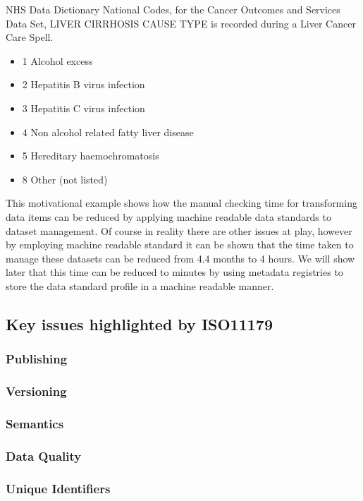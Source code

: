 \documentclass[runningheads]{llncs}
\begin{document}
NHS Data Dictionary National Codes, for the Cancer Outcomes and Services Data Set, LIVER CIRRHOSIS CAUSE TYPE is recorded during a Liver Cancer Care Spell.
\begin{itemize}
	\item 1	Alcohol excess
	\item 2	Hepatitis B virus infection
	\item 3	Hepatitis C virus infection
	\item 4	Non alcohol related fatty liver disease
	\item 5	Hereditary haemochromatosis
	\item 8	Other (not listed)
\end{itemize}
 
This motivational example shows how the manual checking time for transforming data items can be reduced by applying machine readable data standards to dataset management. Of course in reality there are other issues at play, however by employing machine readable standard it can be shown that the time taken to manage these datasets can be reduced from 4.4 months to 4 hours. We will show later that this time can be reduced to minutes by using metadata registries to store the data standard profile in a machine readable manner. 

\subsection{Key issues highlighted by ISO11179}

\subsubsection{Publishing}

\subsubsection{Versioning}
\subsubsection{Semantics}
\subsubsection{Data Quality}
\subsubsection{Unique Identifiers}
\end{document}
